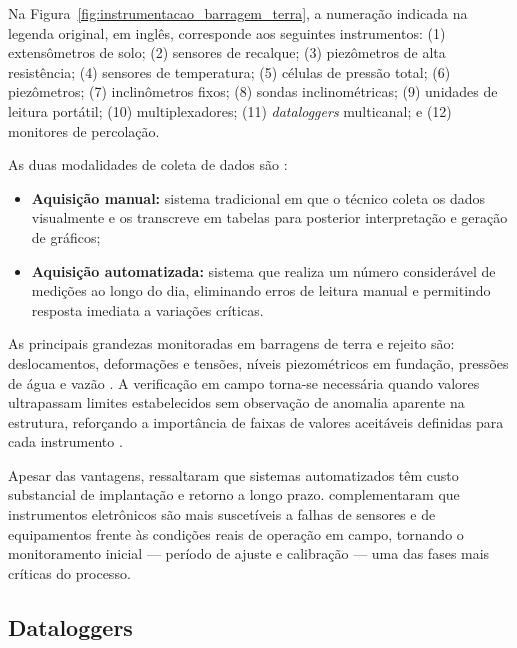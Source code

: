 \noindent Na Figura~\ref{fig:instrumentacao_barragem_terra}, a numeração indicada na legenda original, em inglês, corresponde aos seguintes instrumentos: (1) extensômetros de solo; (2) sensores de recalque; (3) piezômetros de alta resistência; (4) sensores de temperatura; (5) células de pressão total; (6) piezômetros; (7) inclinômetros fixos; (8) sondas inclinométricas; (9) unidades de leitura portátil; (10) multiplexadores; (11) \textit{dataloggers} multicanal; e (12) monitores de percolação.

As duas modalidades de coleta de dados são \cite{machado2007}:
 
\begin{itemize}
    \item \textbf{Aquisição manual:} sistema tradicional em que o técnico
    coleta os dados visualmente e os transcreve em tabelas para posterior
    interpretação e geração de gráficos;
    \item \textbf{Aquisição automatizada:} sistema que realiza um número
    considerável de medições ao longo do dia, eliminando erros de leitura
    manual e permitindo resposta imediata a variações críticas.
\end{itemize}
 
As principais grandezas monitoradas em barragens de terra e rejeito são:
deslocamentos, deformações e tensões, níveis piezométricos em fundação,
pressões de água e vazão \cite{machado2007}. A verificação em campo
torna-se necessária quando valores ultrapassam limites estabelecidos sem
observação de anomalia aparente na estrutura, reforçando a importância de
faixas de valores aceitáveis definidas para cada instrumento
\cite{machado2007}.
 
Apesar das vantagens,  ressaltaram que
sistemas automatizados têm custo substancial de implantação e retorno a
longo prazo.  complementaram que instrumentos
eletrônicos são mais suscetíveis a falhas de sensores e de equipamentos
frente às condições reais de operação em campo, tornando o monitoramento
inicial --- período de ajuste e calibração --- uma das fases mais críticas
do processo.

\FloatBarrier
\subsection{Dataloggers}
\label{subsec:dataloggers}

